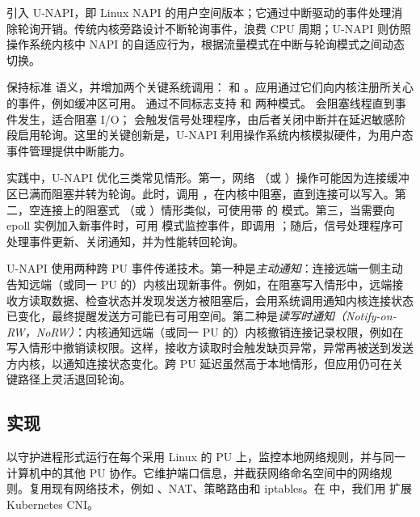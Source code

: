 \gsocket 引入 U-NAPI，即 Linux NAPI\cite{linux-napi} 的用户空间版本；它通过中断驱动的事件处理消除轮询开销。传统内核旁路设计不断轮询事件，浪费 CPU 周期；U-NAPI 则仿照操作系统内核中 NAPI 的自适应行为，根据流量模式在中断与轮询模式之间动态切换。

\gsocket 保持标准  语义，并增加两个关键系统调用： 和 。应用通过它们向内核注册所关心的事件，例如缓冲区可用。 通过不同标志支持  和  两种模式。 会阻塞线程直到事件发生，适合阻塞 I/O； 会触发信号处理程序，由后者关闭中断并在延迟敏感阶段启用轮询。这里的关键创新是，U-NAPI 利用操作系统内核模拟硬件，为用户态事件管理提供中断能力。

实践中，U-NAPI 优化三类常见情形。第一，网络 （或 ）操作可能因为连接缓冲区已满而阻塞并转为轮询。此时，\gsocket 调用 ，在内核中阻塞，直到连接可以写入。第二，空连接上的阻塞式 （或 ）情形类似，\gsocket 可使用带  的  模式。第三，当需要向 epoll 实例加入新事件时，\gsocket 可用  模式监控事件，即调用 ；随后，信号处理程序可处理事件更新、关闭通知，并为性能转回轮询。

U-NAPI 使用两种跨 PU 事件传递技术。第一种是\emph{主动通知}：连接远端一侧主动告知远端（或同一 PU 的）内核出现新事件。例如，在阻塞写入情形中，远端接收方读取数据、检查状态并发现发送方被阻塞后，会用系统调用通知内核连接状态已变化，最终提醒发送方可能已有可用空间。第二种是\emph{读写时通知（Notify-on-RW，NoRW）}：内核通知远端（或同一 PU 的）内核撤销连接记录权限，例如在写入情形中撤销读权限。这样，接收方读取时会触发缺页异常，异常再被送到发送方内核，以通知连接状态变化。跨 PU 延迟虽然高于本地情形，但应用仍可在关键路径上灵活退回轮询。

\subsection{实现}
\label{subs:imp}

\giptable 以守护进程形式运行在每个采用 Linux 的 PU 上，监控本地网络规则，并与同一计算机中的其他 PU 协作。它维护端口信息，并截获网络命名空间中的网络规则。\giptable 复用现有网络技术，例如 、NAT、策略路由和 iptables。在 \sys 中，我们用 \giptable 扩展 Kubernetes CNI。


